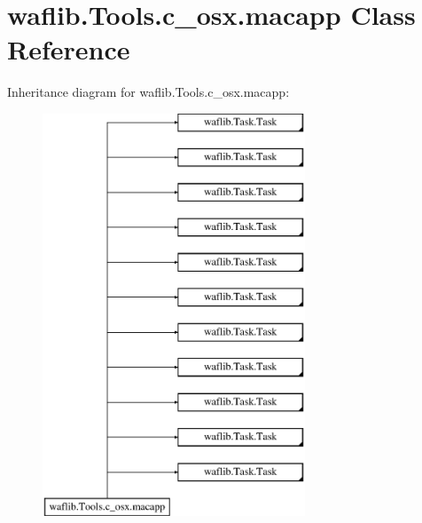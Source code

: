 \hypertarget{classwaflib_1_1_tools_1_1c__osx_1_1macapp}{}\section{waflib.\+Tools.\+c\+\_\+osx.\+macapp Class Reference}
\label{classwaflib_1_1_tools_1_1c__osx_1_1macapp}
Inheritance diagram for waflib.\+Tools.\+c\+\_\+osx.\+macapp\+:\begin{figure}[H]
\begin{center}
\leavevmode
\includegraphics[height=12.000000cm]{classwaflib_1_1_tools_1_1c__osx_1_1macapp}
\end{center}
\end{figure}
